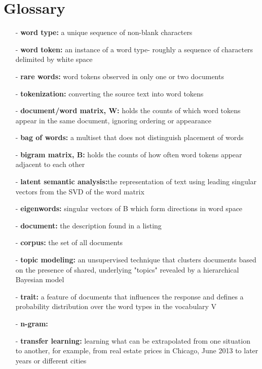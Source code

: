 \documentclass[11pt]{report}
\begin{document}
\section* { Glossary}
\begin{itemize}
\item [-] {\bf word type:} a unique sequence of non-blank characters
\item [-] {\bf word token:} an instance of a word type- roughly a sequence of characters delimited by white space
\item [-] {\bf rare words:} word tokens observed in only one or two documents
\item [-] {\bf tokenization:} converting the source text into word tokens
\item [-] {\bf document/word matrix, W:} holds the counts of which word tokens appear in the same document, ignoring ordering or appearance
\item [-] {\bf bag of words:} a multiset that does not distinguish placement of words
\item [-] {\bf bigram matrix, B:} holds the counts of how often word tokens appear adjacent to each other
\item [-] {\bf latent semantic analysis:}the representation of text using leading singular vectors from the SVD of the word matrix
\item [-] {\bf eigenwords:} singular vectors of B which form directions in word space
\item [-] {\bf document:} the description found in a listing
\item [-] {\bf corpus:} the set of all documents
\item [-] {\bf topic modeling:} an unsupervised technique that clusters documents based on the presence of shared, underlying "topics" revealed by a hierarchical Bayesian model
\item [-] {\bf trait:} a feature of documents that influences the response and defines a probability distribution over the word types in the vocabulary V
\item [-] {\bf n-gram:}
\item [-] {\bf transfer learning:} learning what can be extrapolated from one situation to another, for example, from real estate prices in Chicago, June 2013 to later years or different cities

\end{itemize}
\end{document}
